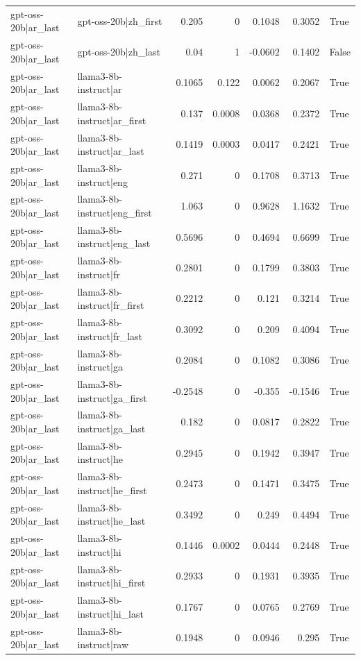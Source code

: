 \begin{table}
\begin{tabular}{l l r r r r l}
gpt-oss-20b|ar_last & gpt-oss-20b|zh_first & 0.205 & 0 & 0.1048 & 0.3052 & True \\
gpt-oss-20b|ar_last & gpt-oss-20b|zh_last & 0.04 & 1 & -0.0602 & 0.1402 & False \\
gpt-oss-20b|ar_last & llama3-8b-instruct|ar & 0.1065 & 0.122 & 0.0062 & 0.2067 & True \\
gpt-oss-20b|ar_last & llama3-8b-instruct|ar_first & 0.137 & 0.0008 & 0.0368 & 0.2372 & True \\
gpt-oss-20b|ar_last & llama3-8b-instruct|ar_last & 0.1419 & 0.0003 & 0.0417 & 0.2421 & True \\
gpt-oss-20b|ar_last & llama3-8b-instruct|eng & 0.271 & 0 & 0.1708 & 0.3713 & True \\
gpt-oss-20b|ar_last & llama3-8b-instruct|eng_first & 1.063 & 0 & 0.9628 & 1.1632 & True \\
gpt-oss-20b|ar_last & llama3-8b-instruct|eng_last & 0.5696 & 0 & 0.4694 & 0.6699 & True \\
gpt-oss-20b|ar_last & llama3-8b-instruct|fr & 0.2801 & 0 & 0.1799 & 0.3803 & True \\
gpt-oss-20b|ar_last & llama3-8b-instruct|fr_first & 0.2212 & 0 & 0.121 & 0.3214 & True \\
gpt-oss-20b|ar_last & llama3-8b-instruct|fr_last & 0.3092 & 0 & 0.209 & 0.4094 & True \\
gpt-oss-20b|ar_last & llama3-8b-instruct|ga & 0.2084 & 0 & 0.1082 & 0.3086 & True \\
gpt-oss-20b|ar_last & llama3-8b-instruct|ga_first & -0.2548 & 0 & -0.355 & -0.1546 & True \\
gpt-oss-20b|ar_last & llama3-8b-instruct|ga_last & 0.182 & 0 & 0.0817 & 0.2822 & True \\
gpt-oss-20b|ar_last & llama3-8b-instruct|he & 0.2945 & 0 & 0.1942 & 0.3947 & True \\
gpt-oss-20b|ar_last & llama3-8b-instruct|he_first & 0.2473 & 0 & 0.1471 & 0.3475 & True \\
gpt-oss-20b|ar_last & llama3-8b-instruct|he_last & 0.3492 & 0 & 0.249 & 0.4494 & True \\
gpt-oss-20b|ar_last & llama3-8b-instruct|hi & 0.1446 & 0.0002 & 0.0444 & 0.2448 & True \\
gpt-oss-20b|ar_last & llama3-8b-instruct|hi_first & 0.2933 & 0 & 0.1931 & 0.3935 & True \\
gpt-oss-20b|ar_last & llama3-8b-instruct|hi_last & 0.1767 & 0 & 0.0765 & 0.2769 & True \\
gpt-oss-20b|ar_last & llama3-8b-instruct|raw & 0.1948 & 0 & 0.0946 & 0.295 & True \\

\end{tabular}
\end{table}
